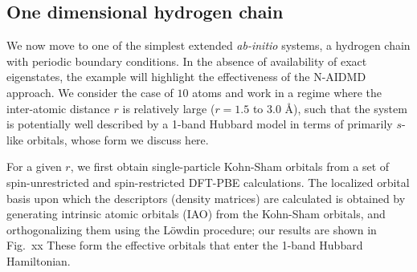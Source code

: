 \subsection{One dimensional hydrogen chain}
We now move to one of the simplest extended \emph{ab-initio} systems, a hydrogen chain with periodic boundary conditions. 
In the absence of availability of exact eigenstates, the example will highlight the effectiveness of the N-AIDMD approach.
We consider the case of $10$ atoms and work in a regime where the inter-atomic distance $r$ is 
relatively large ($r=1.5$ to $3.0$ \AA), such that the system is potentially well described by a 1-band Hubbard model 
in terms of primarily $s$-like orbitals, whose form we discuss here. 

For a given $r$, we first obtain single-particle Kohn-Sham orbitals from a set of spin-unrestricted and 
spin-restricted DFT-PBE calculations. The localized orbital basis upon which the descriptors (density matrices) 
are calculated is obtained by generating intrinsic atomic orbitals (IAO) from the Kohn-Sham orbitals, and orthogonalizing them using 
the L\"owdin procedure; our results are shown in Fig.~xx 
These form the effective orbitals that enter the 1-band Hubbard Hamiltonian. 

